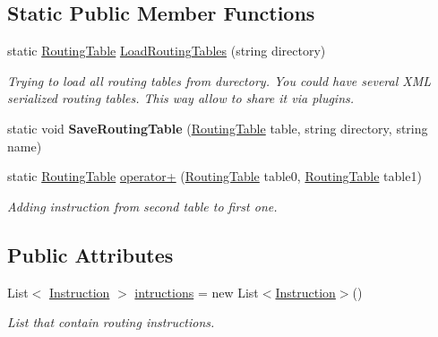 \subsection*{Static Public Member Functions}
\begin{DoxyCompactItemize}
\item 
static \mbox{\hyperlink{class_pipes_provider_1_1_networking_1_1_routing_1_1_routing_table}{Routing\+Table}} \mbox{\hyperlink{class_pipes_provider_1_1_networking_1_1_routing_1_1_routing_table_a2ba1958b64a4d48d4d8f683042ed9cf2}{Load\+Routing\+Tables}} (string directory)
\begin{DoxyCompactList}\small\item\em Trying to load all routing tables from durectory. You could have several X\+ML serialized routing tables. This way allow to share it via plugins. \end{DoxyCompactList}\item 
\mbox{\label{class_pipes_provider_1_1_networking_1_1_routing_1_1_routing_table_a1fe9c42819cd5c5210b254c0d868b336}} 
static void {\bfseries Save\+Routing\+Table} (\mbox{\hyperlink{class_pipes_provider_1_1_networking_1_1_routing_1_1_routing_table}{Routing\+Table}} table, string directory, string name)
\item 
static \mbox{\hyperlink{class_pipes_provider_1_1_networking_1_1_routing_1_1_routing_table}{Routing\+Table}} \mbox{\hyperlink{class_pipes_provider_1_1_networking_1_1_routing_1_1_routing_table_a515b9ad19dc868afb6d47c762064fd96}{operator+}} (\mbox{\hyperlink{class_pipes_provider_1_1_networking_1_1_routing_1_1_routing_table}{Routing\+Table}} table0, \mbox{\hyperlink{class_pipes_provider_1_1_networking_1_1_routing_1_1_routing_table}{Routing\+Table}} table1)
\begin{DoxyCompactList}\small\item\em Adding instruction from second table to first one. \end{DoxyCompactList}\end{DoxyCompactItemize}
\subsection*{Public Attributes}
\begin{DoxyCompactItemize}
\item 
List$<$ \mbox{\hyperlink{class_pipes_provider_1_1_networking_1_1_routing_1_1_instruction}{Instruction}} $>$ \mbox{\hyperlink{class_pipes_provider_1_1_networking_1_1_routing_1_1_routing_table_a1a2c8459b4805d7ee1e81698a389f3f7}{intructions}} = new List$<$\mbox{\hyperlink{class_pipes_provider_1_1_networking_1_1_routing_1_1_instruction}{Instruction}}$>$()
\begin{DoxyCompactList}\small\item\em List that contain routing instructions. \end{DoxyCompactList}\end{DoxyCompactItemize}
